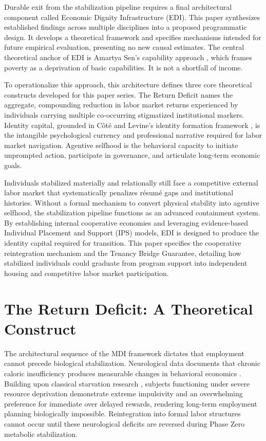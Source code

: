 \documentclass[12pt, letterpaper]{article}
\begin{document}
Durable exit from the stabilization pipeline requires a final architectural component called Economic Dignity Infrastructure (EDI). This paper synthesizes established findings across multiple disciplines into a proposed programmatic design. It develops a theoretical framework and specifies mechanisms intended for future empirical evaluation, presenting no new causal estimates. The central theoretical anchor of EDI is Amartya Sen's capability approach \citep{sen1999development}, which frames poverty as a deprivation of basic capabilities. It is not a shortfall of income.

To operationalize this approach, this architecture defines three core theoretical constructs developed for this paper series. The Return Deficit names the aggregate, compounding reduction in labor market returns experienced by individuals carrying multiple co-occurring stigmatized institutional markers. Identity capital, grounded in C\^{o}t\'{e} and Levine's identity formation framework \citep{cote2002identity}, is the intangible psychological currency and professional narrative required for labor market navigation. Agentive selfhood is the behavioral capacity to initiate unprompted action, participate in governance, and articulate long-term economic goals.

Individuals stabilized materially and relationally still face a competitive external labor market that systematically penalizes r\'{e}sum\'{e} gaps and institutional histories. Without a formal mechanism to convert physical stability into agentive selfhood, the stabilization pipeline functions as an advanced containment system. By establishing internal cooperative economies and leveraging evidence-based Individual Placement and Support (IPS) models, EDI is designed to produce the identity capital required for transition. This paper specifies the cooperative reintegration mechanism and the Tenancy Bridge Guarantee, detailing how stabilized individuals could graduate from program support into independent housing and competitive labor market participation.

\section{The Return Deficit: A Theoretical Construct}

The architectural sequence of the MDI framework dictates that employment cannot precede biological stabilization. Neurological data documents that chronic caloric insufficiency produces measurable changes in behavioral economics \citep{mullainathan2013scarcity}. Building upon classical starvation research \citep{keys1950biology}, subjects functioning under severe resource deprivation demonstrate extreme impulsivity and an overwhelming preference for immediate over delayed rewards, rendering long-term employment planning biologically impossible. Reintegration into formal labor structures cannot occur until these neurological deficits are reversed during Phase Zero metabolic stabilization.
\end{document}
